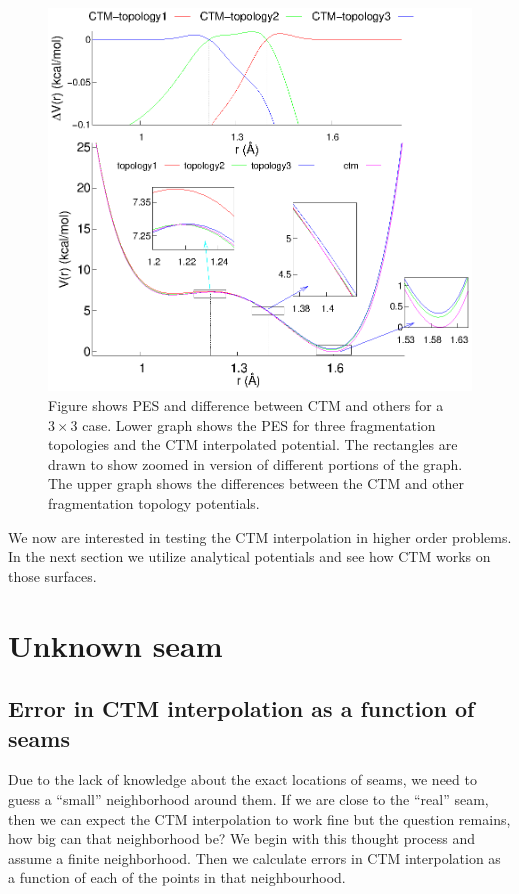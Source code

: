 \begin{figure}[H]
  \begin{center}
    \includegraphics[width=1\textwidth, trim= 0 1 0 0, clip=true]{figures/threeTopoCase.eps}
    \caption{\label{chap3fig10} Figure shows PES and difference between CTM and others for a $3 \times 3 $ case.
    Lower graph shows the PES for three fragmentation topologies and the CTM interpolated potential. The rectangles
    are drawn to show zoomed in version of different portions of the graph. The upper graph shows the differences
    between the CTM and other fragmentation topology potentials.}
  \end{center}
\end{figure}

We now are interested in testing the CTM interpolation in higher order problems. In the next section
we utilize analytical potentials and see how CTM works on those surfaces.

\section{Unknown seam}
{\unknownSeamSection}

\subsection{Error in CTM interpolation as a function of seams}
Due to the lack of knowledge about the exact locations of seams, we need to guess a ``small'' neighborhood
around them. If we are close to the ``real'' seam, then we can expect the CTM interpolation to work fine
but the question remains, how big can that neighborhood be? We begin with this thought process and assume a finite
neighborhood. Then we calculate errors in CTM interpolation as a function of each of the points in that neighbourhood.

